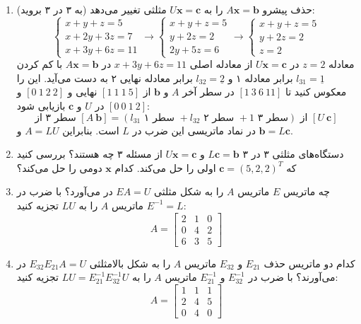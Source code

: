 \documentclass[12pt, a4paper]{book}
\begin{document}
\begin{enumerate}
		\item (به ۳ در ۳ بروید) حذف پیشرو $A\mathbf{x}=\mathbf{b}$ را به $U\mathbf{x}=\mathbf{c}$ مثلثی تغییر می‌دهد:
		\[ \begin{cases} x+y+z=5 \\ x+2y+3z=7 \\ x+3y+6z=11 \end{cases} \to \begin{cases} x+y+z=5 \\ y+2z=2 \\ 2y+5z=6 \end{cases} \to \begin{cases} x+y+z=5 \\ y+2z=2 \\ z=2 \end{cases} \]
		معادله $z=2$ در $U\mathbf{x}=\mathbf{c}$ از معادله اصلی $x+3y+6z=11$ در $A\mathbf{x}=\mathbf{b}$ با کم کردن $l_{31}=\underline{1}$ برابر معادله ۱ و $l_{32}=\underline{2}$ برابر معادله نهایی ۲ به دست می‌آید. این را معکوس کنید تا $[1 \ 3 \ 6 \ 11]$ در سطر آخر $A$ و $\mathbf{b}$ از $[1 \ 1 \ 1 \ 5]$ نهایی و $[0 \ 1 \ 2 \ 2]$ و $[0 \ 0 \ 1 \ 2]$ در $U$ و $\mathbf{c}$ بازیابی شود:
		\[ \text{سطر ۳ از } [A \ \mathbf{b}] = (l_{31} \text{ سطر ۱ } + l_{32} \text{ سطر ۲ } + 1 \text{ سطر ۳}) \text{ از } [U \ \mathbf{c}] \]
		در نماد ماتریسی این ضرب در $L$ است. بنابراین $A=LU$ و $\mathbf{b}=L\mathbf{c}$.
		
		\item دستگاه‌های مثلثی ۳ در ۳ $L\mathbf{c}=\mathbf{b}$ و $U\mathbf{x}=\mathbf{c}$ از مسئله ۳ چه هستند؟ بررسی کنید که $\mathbf{c}=(5,2,2)^T$ اولی را حل می‌کند. کدام $\mathbf{x}$ دومی را حل می‌کند؟
		
		\item چه ماتریس $E$ ماتریس $A$ را به شکل مثلثی $EA=U$ در می‌آورد؟ با ضرب در $E^{-1}=L$ ماتریس $A$ را به $LU$ تجزیه کنید:
		\[ A = \begin{bmatrix} 2 & 1 & 0 \\ 0 & 4 & 2 \\ 6 & 3 & 5 \end{bmatrix} \]
		
		\item کدام دو ماتریس حذف $E_{21}$ و $E_{32}$ ماتریس $A$ را به شکل بالامثلثی $E_{32}E_{21}A=U$ در می‌آورند؟ با ضرب در $E_{32}^{-1}$ و $E_{21}^{-1}$ ماتریس $A$ را به $LU = E_{21}^{-1}E_{32}^{-1}U$ تجزیه کنید:
		\[ A = \begin{bmatrix} 1 & 1 & 1 \\ 2 & 4 & 5 \\ 0 & 4 & 0 \end{bmatrix} \]
		

\end{enumerate}
\end{document}
